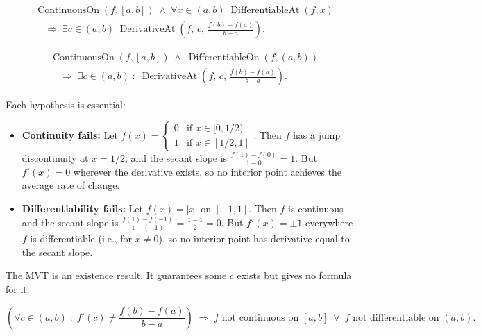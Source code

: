 \begin{remark*}
\begin{align*}
&\operatorname{ContinuousOn}(f,[a,b])
\;\land\;
\forall x \in (a,b)\;\operatorname{DifferentiableAt}(f,x)\\
&\quad\Rightarrow\;
\exists c \in (a,b)\;
\operatorname{DerivativeAt}\!\left(f,\,c,\,\tfrac{f(b)-f(a)}{b-a}\right).
\end{align*}
\end{remark*}

\begin{remark*}
\begin{align*}
&\operatorname{ContinuousOn}(f,[a,b])
\;\land\;
\operatorname{DifferentiableOn}(f,(a,b))\\
&\quad\Longrightarrow\;
\exists c\in(a,b)\;:\;
\operatorname{DerivativeAt}\!\left(f,\,c,\,\tfrac{f(b)-f(a)}{b-a}\right).
\end{align*}
\end{remark*}

\begin{remark*}
Each hypothesis is essential:
\begin{itemize}
  \item \textbf{Continuity fails:} Let $f(x) = \begin{cases} 0 & \text{if } x \in [0,1/2) \\ 1 & \text{if } x \in [1/2,1] \end{cases}$. Then $f$ has a jump discontinuity at $x = 1/2$, and the secant slope is $\tfrac{f(1)-f(0)}{1-0} = 1$. But $f'(x) = 0$ wherever the derivative exists, so no interior point achieves the average rate of change.
  \item \textbf{Differentiability fails:} Let $f(x) = |x|$ on $[-1,1]$. Then $f$ is continuous and the secant slope is $\tfrac{f(1)-f(-1)}{1-(-1)} = \tfrac{1-1}{2} = 0$. But $f'(x) = \pm 1$ everywhere $f$ is differentiable (i.e., for $x \ne 0$), so no interior point has derivative equal to the secant slope.
\end{itemize}
The MVT is an existence result. It guarantees some $c$ exists but gives no formula for it.
\end{remark*}

\begin{remark*}
\[
\left(\forall c \in (a,b)\;:\; f'(c) \ne \frac{f(b)-f(a)}{b-a}\right)
\;\Rightarrow\;
f \text{ not continuous on } [a,b]
\;\lor\;
f \text{ not differentiable on } (a,b).
\]
\end{remark*}

